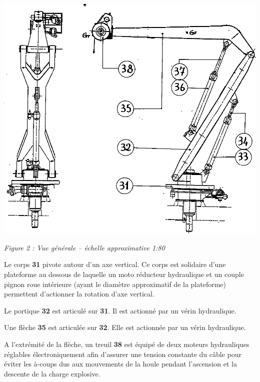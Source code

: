\documentclass[10pt,fleqn]{article} %
\begin{document}
\begin{minipage}[c]{.6\linewidth}
\begin{center}
\includegraphics[width=.95\textwidth]{images/Grue_02}

\textit{Figure 2 : Vue générale -- échelle approximative 1:80}
\end{center}
\end{minipage} \hfill
\begin{minipage}[c]{.38\linewidth}

Le corps \textbf{31} pivote autour d'un axe vertical. Ce corps est solidaire d'une plateforme au dessous de laquelle un moto réducteur hydraulique et un couple pignon roue intérieure (ayant le diamètre approximatif de la plateforme) permettent d'actionner la rotation d'axe vertical.

Le portique \textbf{32}  est articulé sur \textbf{31}. Il est actionné par un vérin hydraulique. 

Une flèche \textbf{35} est articulée sur \textbf{32}. Elle est actionnée par un vérin hydraulique. 
\end{minipage}

\vspace{.25cm}

A l'extrémité de la flèche, un treuil \textbf{38} est équipé de deux moteurs hydrauliques réglables électroniquement afin d'assurer une tension constante du câble pour éviter les à-coups dus aux mouvements de la houle pendant l'ascension et la descente de la charge explosive. 
\end{document}
